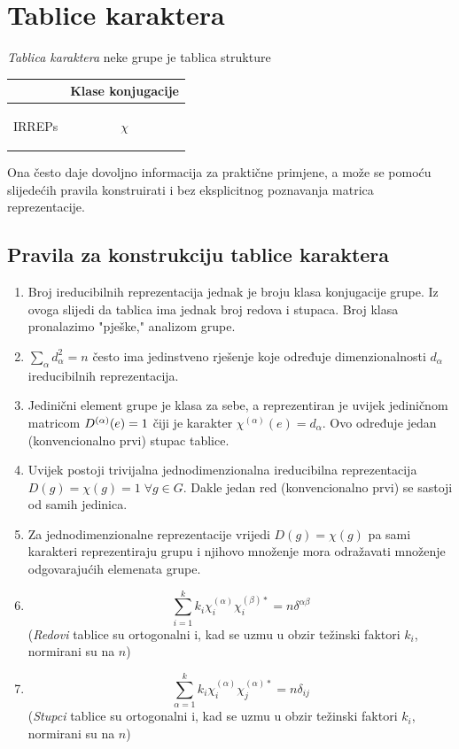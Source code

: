 \section{Tablice karaktera}

\emph{Tablica karaktera} neke grupe je tablica strukture

\begin{tabular}{c|c}
  & Klase konjugacije \\ \hline
\begin{turn}{90} IRREPs \end{turn} & {\Huge $\chi$}
\end{tabular}

Ona često daje dovoljno informacija za praktične primjene, a može
se pomoću slijedećih pravila konstruirati i bez eksplicitnog
poznavanja matrica reprezentacije.

\subsection*{Pravila za konstrukciju tablice karaktera}

\begin{enumerate}

\item Broj ireducibilnih reprezentacija jednak je broju klasa konjugacije 
  grupe. Iz ovoga slijedi da tablica ima jednak broj redova i stupaca. 
  Broj klasa pronalazimo "pješke," analizom grupe.

\item $\sum_{\alpha} d_{\alpha}^2 = n$ često ima jedinstveno rješenje koje
  određuje dimenzionalnosti $d_{\alpha}$ ireducibilnih reprezentacija.

\item Jedinični element grupe je klasa za sebe, a reprezentiran je uvijek
  jediničnom matricom $D^{(\alpha)}(e)=1$ čiji je 
   karakter $\chi^{(\alpha)}(e)=d_{\alpha}$.
  Ovo određuje jedan (konvencionalno prvi) stupac tablice.

\item Uvijek postoji trivijalna jednodimenzionalna ireducibilna
   reprezentacija  $D(g)=\chi(g)=1  \;
    \forall g\in G$.
  Dakle jedan red (konvencionalno prvi) se sastoji od samih jedinica.

\item Za jednodimenzionalne reprezentacije vrijedi $D(g)=\chi(g)$ pa
  sami karakteri reprezentiraju grupu i njihovo množenje mora odražavati
  množenje odgovarajućih elemenata grupe.

\item  \[\sum_{i=1}^{k} k_{i} \chi^{(\alpha)}_{i} \chi^{(\beta) *}_{i} =
    n \delta^{\alpha\beta}\] 
(\emph{Redovi} tablice su ortogonalni i, kad se uzmu u obzir težinski
  faktori $k_i$, normirani su na $n$)

\item  \[\sum_{\alpha=1}^{k} k_{i} \chi^{(\alpha)}_{i} \chi^{(\alpha) *}_{j} =
    n \delta_{ij} \] 
(\emph{Stupci} tablice su ortogonalni i, kad se uzmu u obzir težinski
  faktori $k_i$, normirani su na $n$)

\end{enumerate}

